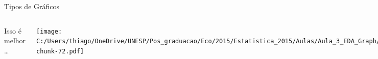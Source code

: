 \documentclass{beamer}\usepackage[]{graphicx}\usepackage[]{color}
\begin{document}
\begin{frame}{Tipos de Gráficos}

\begin{columns}[T]



\scriptsize{Isso é melhor \ldots}

\bigskip

\texttt{[image: C:/Users/thiago/OneDrive/UNESP/Pos\_graduacao/Eco/2015/Estatistica\_2015/Aulas/Aula\_3\_EDA\_Graph/figs/unnamed-chunk-72.pdf]}

\pause


\scriptsize{\ldots do que isso!}

\vfill

\texttt{[image: C:/Users/thiago/OneDrive/UNESP/Pos\_graduacao/Eco/2015/Estatistica\_2015/Aulas/Aula\_3\_EDA\_Graph/figs/badplot.pdf]}

\end{columns}

\end{frame}
\end{document}
